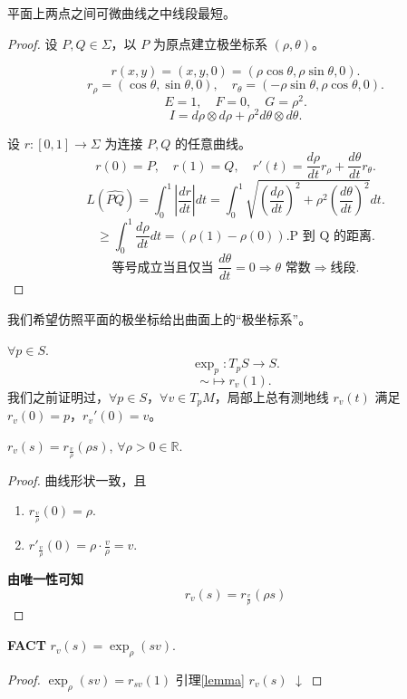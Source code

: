 \documentclass[lang=cn,10pt,thmcnt=section]{elegantbook}
\begin{document}
\begin{theorem}
    平面上两点之间可微曲线之中线段最短。
\end{theorem}
\begin{proof}
    设 $P, Q \in \Sigma$，以 $P$ 为原点建立极坐标系 $(\rho, \theta)$。

\[
r(x, y) = (x, y, 0) = (\rho \cos \theta, \rho \sin \theta, 0).
\]
\[
r_{\rho} = (\cos \theta, \sin \theta, 0), \quad r_{\theta} = (-\rho \sin \theta, \rho \cos \theta, 0).
\]
\[
E = 1, \quad F = 0, \quad G = \rho^2.
\]
\[
I = d\rho \otimes d\rho + \rho^2 d\theta \otimes d\theta.
\]

设 $r: [0,1] \rightarrow \Sigma$ 为连接 $P, Q$ 的任意曲线。
\[
r(0) = P, \quad r(1) = Q, \quad r'(t) = \frac{d\rho}{dt} r_{\rho} + \frac{d\theta}{dt} r_{\theta}.
\]
\[
L(\widehat{PQ}) = \int_0^1 \left| \frac{dr}{dt} \right| dt = \int_0^1 \sqrt{\left( \frac{d\rho}{dt} \right)^2 + \rho^2 \left( \frac{d\theta}{dt} \right)^2} dt.
\]
\[
\geq \int_0^1 \frac{d\rho}{dt} dt = (\rho(1) - \rho(0)).\text{P 到 Q 的距离}.
\]
\[
\text{等号成立当且仅当 } \frac{d\theta}{dt} = 0 \Rightarrow \theta \text{ 常数} \Rightarrow \text{线段}.
\]

\end{proof}
我们希望仿照平面的极坐标给出曲面上的“极坐标系”。
\begin{definition}[指数映射]
    $\forall p \in S$.
\[
\exp_p: T_pS \longrightarrow S.
\]
\[
\sim \longmapsto r_v(1).
\]
我们之前证明过，$\forall p \in S$，$\forall v \in T_pM$，局部上总有测地线 $r_v(t)$ 满足 $r_v(0) = p$，$r_v'(0) = v$。
\end{definition}
\begin{lemma}\label{lemma}
    \( r_v(s) = r_{\frac{v}{\rho}}(\rho s) \), \(\forall \rho > 0 \in \mathbb{R}\).
\end{lemma}
\begin{proof}
    曲线形状一致，且
    \begin{enumerate}
        \item \(\displaystyle r_{\frac{v}{\rho}}(0) = \rho\).
        \item \(\displaystyle r'_{\frac{v}{\rho}}(0) = \rho \cdot \frac{v}{\rho} = v\).
    \end{enumerate}
    
    \textbf{由唯一性可知}
    \[
    r_v(s) = r_{\frac{v}{\rho}}(\rho s)
    \]
\end{proof}

\textbf{FACT} \quad \( r_v(s) = \exp_{\rho}(sv) \).
\begin{proof}
    \(\exp_{\rho}(sv) = r_{sv}(1)\) 引理\ref{lemma} \(r_v(s)\) \(\downarrow\)
\end{proof}
\end{document}
